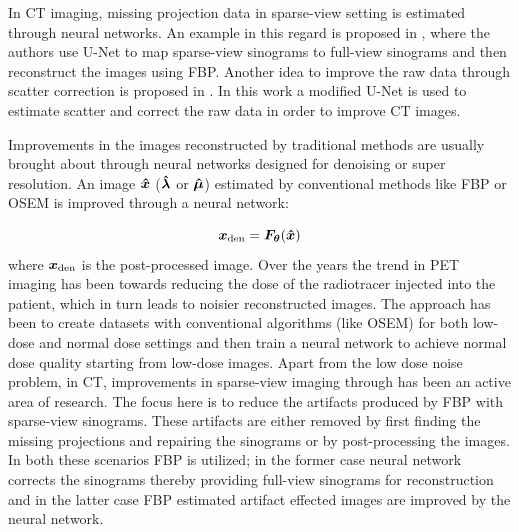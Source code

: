 In \ac{CT} imaging, missing projection data in sparse-view setting is estimated through neural networks. An example in this regard is proposed in \cite{lee2018deep}, where the authors use U-Net to map sparse-view sinograms to full-view sinograms and then reconstruct the images using \ac{FBP}. Another idea to improve the raw data through scatter correction is proposed in \cite{maier2018deep}. In this work a modified U-Net is used to estimate scatter and correct the raw data in order to improve \ac{CT} images. 

Improvements in the images reconstructed by traditional methods are usually brought about through neural networks designed for denoising or super resolution. An image $\bm{\hat{x}}$ ($\bm{\hat{\lambda}}$ or $\bm{\hat{\mu}}$) estimated by conventional methods like \ac{FBP} or \ac{OSEM} is improved through a neural network:

\begin{equation}\label{eq:post_pro}
\bm{x}_{\mathrm{den}} = \bm{F}_{\bm{\theta}} (\bm{\hat{x}})
\end{equation} 
where $\bm{x}_{\mathrm{den}}$ is the post-processed image. Over the years the trend in \ac{PET} imaging has been towards reducing the dose of the radiotracer injected into the patient, which in turn leads to noisier reconstructed images. The approach has been to create datasets with conventional algorithms (like \ac{OSEM}) for both low-dose and normal dose settings and then train a neural network to achieve normal dose quality starting from low-dose images. Apart from the low dose noise problem, in \ac{CT}, improvements in sparse-view imaging through has been an active area of research. The focus here is to reduce the artifacts produced by \ac{FBP} with sparse-view sinograms. These artifacts are either removed by first finding the missing projections and repairing the sinograms or by post-processing the images. In both these scenarios \ac{FBP} is utilized; in the former case neural network corrects the sinograms thereby providing full-view sinograms for reconstruction and in the latter case \ac{FBP} estimated artifact effected images are improved by the neural network.  

